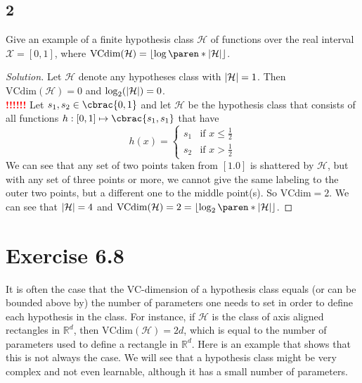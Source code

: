 \documentclass[10pt, a4paper, twoside]{amsart}
\theoremstyle{plain}
\newcommand{\R}{\ensuremath{\mathbb{R}}}
\DeclarePairedDelimiter\abs{\lvert}{\rvert}
\DeclarePairedDelimiter\cbrac\{\}
\DeclarePairedDelimiter\paren()
\newcommand{\cH}{\ensuremath{\mathcal{H}}}
\newcommand{\cX}{\ensuremath{\mathcal{X}}}
\newenvironment{solution}
               {\let\oldqedsymbol=\qedsymbol
                \renewcommand{\qedsymbol}{$\blacktriangleleft$}
                \begin{proof}[Solution]}
               {\end{proof}
                \renewcommand{\qedsymbol}{\oldqedsymbol}}
\newcommand{\TODO}{\textcolor{red}{\textbf{!!!!!! }}}
\begin{document}
\subsection*{2}
Give an example of a finite hypothesis class $\cH$ of functions over the real interval $\cX = [0,1]$, where $\text{VCdim}(\cH) = \left\lfloor \log \paren*{\abs{\cH}} \right\rfloor$.
 \begin{solution}
   Let $\cH$ denote any hypotheses class with $\abs{\cH}=1$. Then $\mathrm{VCdim}(\cH)=0$ and $\log_2(\abs{\cH})=0$.\\
   \TODO
   Let $s_1,s_2 \in \cbrac{0,1}$ and let $ \cH$ be the hypothesis class that consists of all functions $h: [0,1] \mapsto \cbrac{s_1,s_1}$ that have
   \begin{equation*}
     h(x) = \begin{cases}
         s_1 & \mbox{if } x \leq \frac{1}{2} \\
         s_2 & \mbox{if } x > \frac{1}{2}
       \end{cases}
     \end{equation*}
     We can see that any set of two points taken from $[1.0]$ is shattered by $\cH$, but with any set of three points or more, we cannot give the same labeling to the outer two points, but a different one to the middle point(s). So $\text{VCdim} = 2$.
   We can see that $\abs{\cH} = 4$ and $\text{VCdim}(\cH) = 2 = \lfloor \log_2\paren*{\abs{\cH}} \rfloor$.
 \end{solution}
 
\section*{Exercise 6.8}
It is often the case that the VC-dimension of a hypothesis class equals (or can be bounded above by) the number of parameters one needs to set in order to define each hypothesis in the class. For instance, if $\cH$ is the class of axis aligned rectangles in $\R^d$, then $\text{VCdim}(\cH) = 2d$, which is equal to the number of parameters used to define a rectangle in $\R^d$. Here is an example that shows that this is not always the case. We will see that a hypothesis class might be very complex and not even learnable, although it has a small number of parameters.
\end{document}
